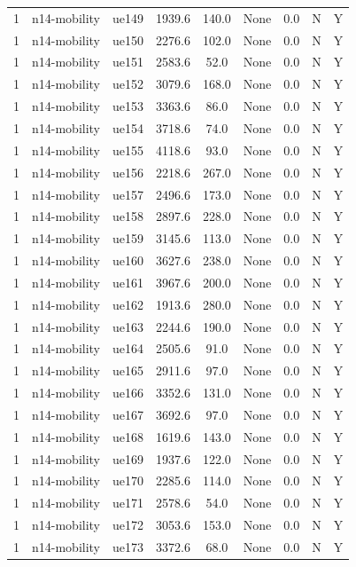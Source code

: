 \begin{table}[ht]
\begin{tabular}{|c|c|c|c|c|c|c|c|c|}
1 & n14-mobility & ue149 & 1939.6 & 140.0 & None & 0.0 & N & Y \\
1 & n14-mobility & ue150 & 2276.6 & 102.0 & None & 0.0 & N & Y \\
1 & n14-mobility & ue151 & 2583.6 & 52.0 & None & 0.0 & N & Y \\
1 & n14-mobility & ue152 & 3079.6 & 168.0 & None & 0.0 & N & Y \\
1 & n14-mobility & ue153 & 3363.6 & 86.0 & None & 0.0 & N & Y \\
1 & n14-mobility & ue154 & 3718.6 & 74.0 & None & 0.0 & N & Y \\
1 & n14-mobility & ue155 & 4118.6 & 93.0 & None & 0.0 & N & Y \\
1 & n14-mobility & ue156 & 2218.6 & 267.0 & None & 0.0 & N & Y \\
1 & n14-mobility & ue157 & 2496.6 & 173.0 & None & 0.0 & N & Y \\
1 & n14-mobility & ue158 & 2897.6 & 228.0 & None & 0.0 & N & Y \\
1 & n14-mobility & ue159 & 3145.6 & 113.0 & None & 0.0 & N & Y \\
1 & n14-mobility & ue160 & 3627.6 & 238.0 & None & 0.0 & N & Y \\
1 & n14-mobility & ue161 & 3967.6 & 200.0 & None & 0.0 & N & Y \\
1 & n14-mobility & ue162 & 1913.6 & 280.0 & None & 0.0 & N & Y \\
1 & n14-mobility & ue163 & 2244.6 & 190.0 & None & 0.0 & N & Y \\
1 & n14-mobility & ue164 & 2505.6 & 91.0 & None & 0.0 & N & Y \\
1 & n14-mobility & ue165 & 2911.6 & 97.0 & None & 0.0 & N & Y \\
1 & n14-mobility & ue166 & 3352.6 & 131.0 & None & 0.0 & N & Y \\
1 & n14-mobility & ue167 & 3692.6 & 97.0 & None & 0.0 & N & Y \\
1 & n14-mobility & ue168 & 1619.6 & 143.0 & None & 0.0 & N & Y \\
1 & n14-mobility & ue169 & 1937.6 & 122.0 & None & 0.0 & N & Y \\
1 & n14-mobility & ue170 & 2285.6 & 114.0 & None & 0.0 & N & Y \\
1 & n14-mobility & ue171 & 2578.6 & 54.0 & None & 0.0 & N & Y \\
1 & n14-mobility & ue172 & 3053.6 & 153.0 & None & 0.0 & N & Y \\
1 & n14-mobility & ue173 & 3372.6 & 68.0 & None & 0.0 & N & Y \\

\end{tabular}
\end{table}
